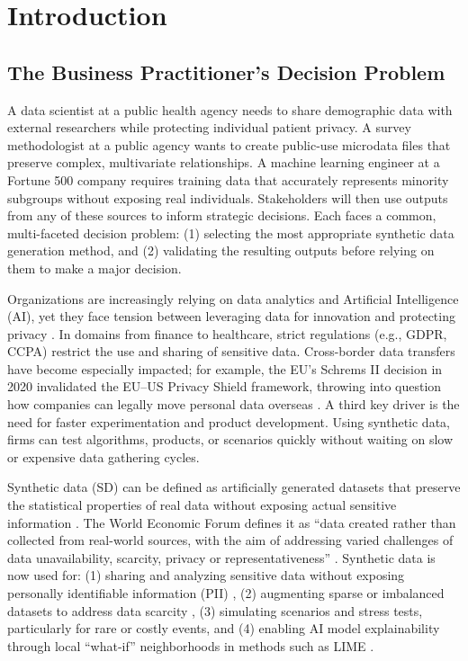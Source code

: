 \documentclass[12pt,a4paper]{article}
\begin{document}
\newpage
\tableofcontents
\newpage

\section{Introduction}

\subsection{The Business Practitioner's Decision Problem}

A data scientist at a public health agency needs to share demographic data with external researchers while protecting individual patient privacy. A survey methodologist at a public agency wants to create public-use microdata files that preserve complex, multivariate relationships. A machine learning engineer at a Fortune 500 company requires training data that accurately represents minority subgroups without exposing real individuals. Stakeholders will then use outputs from any of these sources to inform strategic decisions. Each faces a common, multi-faceted decision problem: (1) selecting the most appropriate synthetic data generation method, and (2) validating the resulting outputs before relying on them to make a major decision.

Organizations are increasingly relying on data analytics and Artificial Intelligence (AI), yet they face tension between leveraging data for innovation and protecting privacy \citep{hbr2021synthetic}. In domains from finance to healthcare, strict regulations (e.g., GDPR, CCPA) restrict the use and sharing of sensitive data. Cross-border data transfers have become especially impacted; for example, the EU's Schrems II decision in 2020 invalidated the EU--US Privacy Shield framework, throwing into question how companies can legally move personal data overseas \citep{iapp2024schrems}. A third key driver is the need for faster experimentation and product development. Using synthetic data, firms can test algorithms, products, or scenarios quickly without waiting on slow or expensive data gathering cycles.

Synthetic data (SD) can be defined as artificially generated datasets that preserve the statistical properties of real data without exposing actual sensitive information \citep{eastwood2023synthetic}. The World Economic Forum defines it as ``data created rather than collected from real-world sources, with the aim of addressing varied challenges of data unavailability, scarcity, privacy or representativeness'' \citep{wef2025synthetic}. Synthetic data is now used for: (1) sharing and analyzing sensitive data without exposing personally identifiable information (PII) \citep{giuffre2023synthetic}, (2) augmenting sparse or imbalanced datasets to address data scarcity \citep{goyal2024synthetic}, (3) simulating scenarios and stress tests, particularly for rare or costly events, and (4) enabling AI model explainability through local ``what-if'' neighborhoods in methods such as LIME \citep{guidotti2023counterfactual}.
\end{document}
